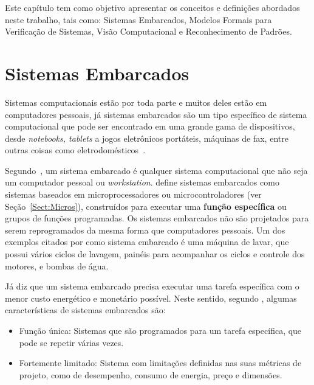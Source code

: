 
\label{chapter:fund_teo}
Este capítulo tem como objetivo apresentar os conceitos e definições abordados neste trabalho, tais como: Sistemas Embarcados, Modelos Formais para Verificação de Sistemas, Visão Computacional e Reconhecimento de Padrões.
  
    
    
\section{Sistemas Embarcados} 

Sistemas computacionais estão por toda parte e muitos deles estão em computadores pessoais, já sistemas embarcados são um tipo específico de sistema computacional que pode ser encontrado em uma grande gama de dispositivos, desde \textit{notebooks, tablets} a jogos eletrônicos portáteis, máquinas de fax, entre outras coisas como eletrodomésticos~\cite{vahid:2002}.

Segundo~, um sistema embarcado é qualquer sistema computacional que não seja um computador pessoal ou \textit{workstation}.  define sistemas embarcados como sistemas baseados em microprocessadores ou microcontroladores (ver Seção~\ref{Sect:Micros}), construídos para executar uma \textbf{função específica} ou grupos de funções programadas. Os sistemas embarcados não são projetados para serem reprogramados da mesma forma que computadores pessoais.
% 
Um dos exemplos citados por \cite{heath:2002} como sistema embarcado é uma máquina de lavar, que possui vários ciclos de lavagem, painéis para acompanhar os ciclos e controle dos motores, e bombas de água.


Já  diz que um sistema embarcado precisa executar uma tarefa específica com o menor custo energético e monetário possível.
Neste sentido, segundo , algumas características de sistemas embarcados são:\begin{itemize}
\item Função única: Sistemas que são programados para um tarefa específica, que pode se repetir várias vezes.
\item Fortemente limitado: Sistema com limitações definidas nas suas métricas de projeto, como de desempenho, consumo de energia, preço e dimensões.
\end{itemize}


 

